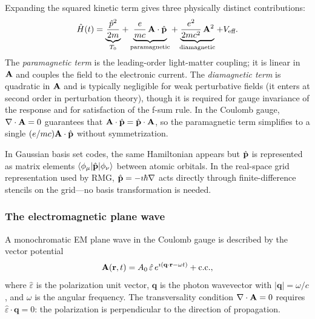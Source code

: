 Expanding the squared kinetic term gives three physically distinct
contributions:
\begin{equation}
  \hat{H}(t)
  = \underbrace{\frac{\hat{p}^2}{2m}}_{T_0}
  + \underbrace{\frac{e}{mc}\,\mathbf{A}\cdot\hat{\mathbf{p}}}_{\text{paramagnetic}}
  + \underbrace{\frac{e^2}{2mc^2}\,\mathbf{A}^2}_{\text{diamagnetic}}
  + V_\text{eff}.
  \label{eq:H-expanded}
\end{equation}
The \emph{paramagnetic term} is the leading-order light-matter
coupling; it is linear in $\mathbf{A}$ and couples the field to the
electronic current.
The \emph{diamagnetic term} is quadratic in $\mathbf{A}$ and is typically
negligible for weak perturbative fields (it enters at second order
in perturbation theory), though it is required for gauge invariance
of the response and for satisfaction of the f-sum rule.
In the Coulomb gauge, $\nabla\cdot\mathbf{A} = 0$ guarantees that
$\mathbf{A}\cdot\hat{\mathbf{p}} = \hat{\mathbf{p}}\cdot\mathbf{A}$, so the paramagnetic term
simplifies to a single $(e/mc)\mathbf{A}\cdot\hat{\mathbf{p}}$ without
symmetrization.

In Gaussian basis set codes, the same Hamiltonian appears but
$\hat{\mathbf{p}}$ is represented as matrix elements
$\langle\phi_\mu|\hat{\mathbf{p}}|\phi_\nu\rangle$ between atomic orbitals.
In the real-space grid representation used by RMG, $\hat{\mathbf{p}} =
-\imath\hbar\nabla$ acts directly through finite-difference stencils
on the grid---no basis transformation is needed.


\subsubsection{The electromagnetic plane wave}
\label{sec:plane-wave}

A monochromatic EM plane wave in the Coulomb gauge is described by
the vector potential
\begin{equation}
  \mathbf{A}(\mathbf{r},t)
  = A_0\,\hat{\varepsilon}\,
    e^{\imath(\mathbf{q}\cdot\mathbf{r}-\omega t)}
    + \text{c.c.},
  \label{eq:plane-wave-A}
\end{equation}
where $\hat{\varepsilon}$ is the polarization unit vector,
$\mathbf{q}$ is the photon wavevector with $|\mathbf{q}|=\omega/c$,
and $\omega$ is the angular frequency.
The transversality condition $\nabla\cdot\mathbf{A}=0$ requires
$\hat{\varepsilon}\cdot\mathbf{q}=0$: the polarization is
perpendicular to the direction of propagation.


